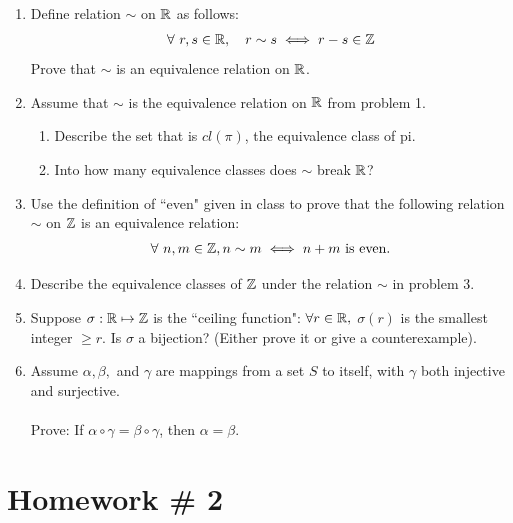 \begin{enumerate}
    \item Define relation $\sim$ on ${\mathbb{ R}}$ as follows:
    \begin{align}
        \forall \ r,s \in {\mathbb{ R}}, \ \ \ r\sim s \iff r-s\in {\mathbb{ Z}} \nonumber
    \end{align}
    Prove that $\sim$ is an equivalence relation on ${\mathbb{ R}}$. \\ \steezybreak

    \item Assume that $\sim$ is the equivalence relation on ${\mathbb{ R}}$ from problem 1.
    \begin{enumerate}[label=\alph*)]
        \item Describe the set that is $cl(\pi)$, the equivalence class of pi.
        \item Into how many equivalence classes does $\sim$ break ${\mathbb{ R}}$? \\ \steezybreak
        
    \end{enumerate}
    \item Use the definition of ``even" given in class to prove that the following relation $\sim$ on ${\mathbb{ Z}}$ is an equivalence relation:
    \begin{align}
        \forall \ n,m \in {\mathbb{ Z}}, n\sim m \iff n+m \text{ is even.}\nonumber
    \end{align}
    \item Describe the equivalence classes of ${\mathbb{ Z}}$ under the relation $\sim$ in problem 3. \\ \steezybreak
    
    \item Suppose $\sigma : {\mathbb{ R}} \mapsto {\mathbb{ Z}}$ is the ``ceiling function": $\forall r\in {\mathbb{ R}},$ $\sigma(r)$ is the smallest integer $\geq r$. Is $\sigma$ a bijection? (Either prove it or give a counterexample). \\ \steezybreak
    
    \item Assume $\alpha, \beta,$ and $\gamma$ are mappings from a set $S$ to itself, with $\gamma$ both injective and surjective. \\ \\
    Prove: If $\alpha \circ \gamma = \beta \circ \gamma$, then $\alpha = \beta$.
\end{enumerate}
\newpage

\section{Homework \# 2}
\label{sec:HW2}

